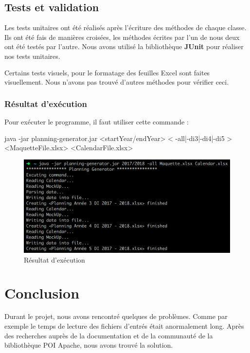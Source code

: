 \documentclass{polytech/polytech}
\begin{document}
	\section{Tests et validation}

	Les tests unitaires ont été réalisés après l'écriture des méthodes de chaque classe.
	Ils ont été fais de manières croisées, les méthodes écrites par l'un de nous deux ont été testés par l'autre.
	Nous avons utilisé la bibliothèque \textbf{JUnit} pour réaliser nos tests unitaires.

	Certains tests visuels, pour le formatage des feuilles Excel sont faites visuellement.
	Nous n'avons pas trouvé d'autres méthodes pour vérifier ceci.

	\subsection{Résultat d'exécution}

	Pour exécuter le programme, il faut utiliser cette commande :

	\begin{latexsource}
	java -jar planning-generator.jar <startYear/endYear> < -all|-di3|-di4|-di5 > <MaquetteFile.xlsx> <CalendarFile.xlsx>
	\end{latexsource}

	\begin{figure}
		\caption{Résultat d'exécution}
		\includegraphics[width=15cm]{./img/excution_result2.png}
	\end{figure}

	\chapter{Conclusion}

	Durant le projet, nous avons rencontré quelques de problèmes.
	Comme par exemple le temps de lecture des fichiers d'entrés était anormalement long.
	Après des recherches auprès de la documentation et de la communauté de la bibliothèque POI Apache, nous avons trouvé la solution.
\end{document}
